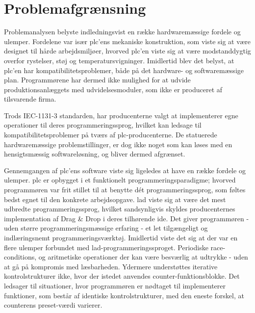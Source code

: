 \section{Problemafgrænsning}
Problemanalysen belyste indledningsvist en række hardwaremæssige fordele og ulemper. Fordelene var især \gls{plc}'ens mekaniske konstruktion, som viste sig at være designet til hårde arbejdsmiljøer, hvorved \gls{plc}'en viste sig at være modstanddygtig overfor rystelser, støj og temperatursvigninger. Imidlertid blev det belyst, at \gls{plc}'en har kompatibilitetsproblemer, både på det hardware- og softwaremæssige plan. Programmørene har dermed ikke mulighed for at udvide produktionsanlæggets med udvidelsesmoduler, som ikke er produceret af tilsvarende firma.

Trods IEC-1131-3 standarden, har producenterne valgt at implementerer egne operationer til deres programmeringssprog, hvilket kan ledsage til kompatibilitetsproblemer på tværs af \gls{plc}-producenterne. De statuerede hardwaremæssige problemstillinger, er dog ikke noget som kan løses med en hensigtsmæssig softwareløsning, og bliver dermed afgrænset. 

Gennemgangen af \gls{plc}'ens software viste sig ligeledes at have en række fordele og ulemper. \gls{plc} er opbygget i et funktionelt programmeringsparadigme; hvorved programmøren var frit stillet til at benytte dét programmeringssprog, som føltes bedst egnet til den konkrete arbejdsopgave. \gls{lad} viste sig at være det mest udbredte programmeringssprog, hvilket sandsynligvis skyldes producenternes implementation af Drag \& Drop i deres tilhørende \gls{ide}. Det giver programmøren - uden større programmeringsmæssige erfaring - et let tilgængeligt og indlæringsnemt programmeringsværktøj. Imidlertid viste det sig at der var en flere ulemper forbundet med \gls{lad}-programmeringssproget. Periodiske race-conditions, og aritmetiske operationer der kan være besværlig at udtrykke - uden at gå på kompromis med læsbarheden. Ydermere understøttes iterative kontrolstrukturer ikke, hvor der istedet anvendes counter-funktionsblokke. Det ledsager til situationer, hvor programmøren er nødtaget til implementerer funktioner, som består af identiske kontrolstrukturer, med den eneste forskel, at counterens preset-værdi varierer. 
